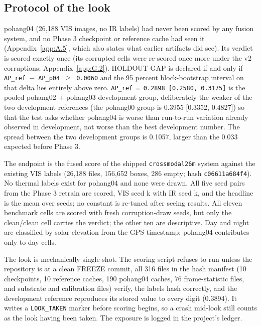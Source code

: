 \documentclass[journal,onecolumn]{IEEEtran}
\begin{document}
\subsection{Protocol of the look}\label{app:G.1}
pohang04 (26,188 VIS images, no IR labels) had never been scored by any fusion system, and no Phase 3 checkpoint or reference cache had seen it (Appendix~\ref{app:A.5}, which also states what earlier artifacts did see). Its verdict is scored exactly once (its corrupted cells were re-scored once more under the v2 corruptions; Appendix~\ref{app:G.2}). HOLDOUT-GAP is declared if and only if \texttt{AP\_\allowbreak{}ref $-\allowbreak{}$ AP\_\allowbreak{}p04 $\geq$ 0.0060} and the 95 percent block-bootstrap interval on that delta lies entirely above zero. \texttt{AP\_\allowbreak{}ref = 0.2898 [0.2580, 0.3175]} is the pooled pohang02 + pohang03 development group, deliberately the weaker of the two development references (the pohang00 group is 0.3955 [0.3352, 0.4827]) so that the test asks whether pohang04 is worse than run-to-run variation already observed in development, not worse than the best development number. The spread between the two development groups is 0.1057, larger than the 0.033 expected before Phase 3.

The endpoint is the fused score of the shipped \texttt{crossmodal26m} system against the existing VIS labels (26,188 files, 156,652 boxes, 286 empty; hash \texttt{c06611a684f4}). No thermal labels exist for pohang04 and none were drawn. All five seed pairs from the Phase 3 retrain are scored, VIS seed k with IR seed k, and the headline is the mean over seeds; no constant is re-tuned after seeing results. All eleven benchmark cells are scored with fresh corruption-draw seeds, but only the clean/clean cell carries the verdict; the other ten are descriptive. Day and night are classified by solar elevation from the GPS timestamp; pohang04 contributes only to day cells.

The look is mechanically single-shot. The scoring script refuses to run unless the repository is at a clean FREEZE commit, all 316 files in the hash manifest (10 checkpoints, 10 reference caches, 190 pohang04 caches, 76 frame-statistic files, and substrate and calibration files) verify, the labels hash correctly, and the development reference reproduces its stored value to every digit (0.3894). It writes a \texttt{LOOK\_\allowbreak{}TAKEN} marker before scoring begins, so a crash mid-look still counts as the look having been taken. The exposure is logged in the project's ledger.
\end{document}
